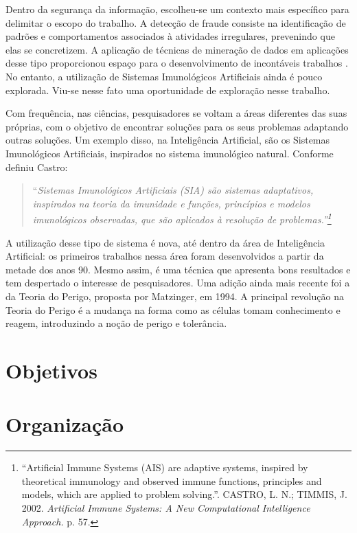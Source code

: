 Dentro da segurança da informação, escolheu-se um contexto mais específico para delimitar o escopo do trabalho. A detecção de fraude consiste na identificação de padrões e comportamentos associados à atividades irregulares, prevenindo que elas se concretizem. A aplicação de técnicas de mineração de dados em aplicações desse tipo proporcionou espaço para o desenvolvimento de incontáveis trabalhos \cite{Phua2010}. No entanto, a utilização de Sistemas Imunológicos Artificiais ainda é pouco explorada. Viu-se nesse fato uma oportunidade de exploração nesse trabalho.

Com frequência, nas ciências, pesquisadores se voltam a áreas diferentes das suas próprias, com o objetivo de encontrar soluções para os seus problemas adaptando outras soluções. Um exemplo disso, na Inteligência Artificial, são os Sistemas Imunológicos Artificiais, inspirados no sistema imunológico natural. Conforme definiu Castro:

\begin{quote}
``\emph{Sistemas Imunológicos Artificiais (SIA) são sistemas adaptativos, inspirados na teoria da imunidade e funções, princípios e modelos imunológicos observadas, que são aplicados à resolução de problemas.''\footnote{``Artificial Immune Systems (AIS) are adaptive systems, inspired by theoretical immunology and observed immune functions, principles and models, which are applied to problem solving.''. CASTRO, L. N.; TIMMIS, J. 2002. \emph{Artificial Immune Systems: A New Computational Intelligence Approach.} p. 57.}}
\end{quote}

A utilização desse tipo de sistema é nova, até dentro da área de Inteligência Artificial: os primeiros trabalhos nessa área foram desenvolvidos a partir da metade dos anos 90. Mesmo assim, é uma técnica que apresenta bons resultados e tem despertado o interesse de pesquisadores. Uma adição ainda mais recente foi a da Teoria do Perigo, proposta por Matzinger, em 1994. A principal revolução na Teoria do Perigo é a mudança na forma como as células tomam conhecimento e reagem, introduzindo a noção de perigo e tolerância.

\section{Objetivos}
\section{Organização}


